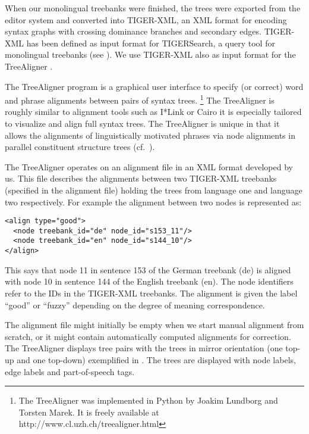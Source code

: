 \documentclass[output=paper]{LSP/langsci}
\begin{document}
When our monolingual treebanks were finished, the trees were exported from the editor system and converted into TIGER-XML, an XML format for encoding syntax graphs with crossing dominance branches and secondary edges. TIGER-XML has been defined as input format for TIGERSearch, a query tool for monolingual treebanks (see ). We use TIGER-XML also as input format for the TreeAligner \citep{VolkEtAl2006}. 

The TreeAligner program is a graphical user interface to specify (or correct) word and phrase alignments between pairs of syntax trees. \footnote{The TreeAligner was implemented in Python by Joakim Lundborg and Torsten Marek. It is freely available at http://www.cl.uzh.ch/treealigner.html} The TreeAligner is roughly similar to alignment tools such as I*Link \citep{AhrenbergEtAl2002} or Cairo \citeauthor{Smith2000} it is especially tailored to visualize and align full syntax trees. The TreeAligner is unique in that it allows the alignments of linguistically motivated phrases via node alignments in parallel constituent structure trees (cf.~\citealt{Samuelsson2007}). 

The TreeAligner operates on an alignment file in an XML format developed by us. This file describes the alignments between two TIGER-XML treebanks (specified in the alignment file) holding the trees from language one and language two respectively. For example the alignment between two nodes is represented as: 

\ea
\begin{lstlisting}
<align type="good"> 
  <node treebank_id="de" node_id="s153_11"/> 
  <node treebank_id="en" node_id="s144_10"/> 
</align>
\end{lstlisting}
\z 

This says that node 11 in sentence 153 of the German treebank (de) is aligned with node 10 in sentence 144 of the English treebank (en). The node identifiers refer to the IDs in the TIGER-XML treebanks. The alignment is given the label ``good'' or ``fuzzy'' depending on the degree of meaning correspondence. 


The alignment file might initially be empty when we start manual alignment from scratch, or it might contain automatically computed alignments for correction. The TreeAligner displays tree pairs with the trees in mirror orientation (one top-up and one top-down) exemplified in . The trees are displayed with node labels, edge labels and part-of-speech tags. 
\end{document}
